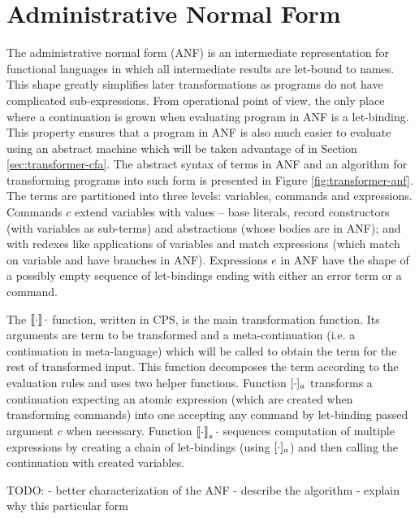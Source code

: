 \section{Administrative Normal Form}
The administrative normal form (ANF) \cite{flanagan-anf} is an intermediate representation for functional languages in which all intermediate results are let-bound to names.
This shape greatly simplifies later transformations as programs do not have complicated sub-expressions.
From operational point of view, the only place where a continuation is grown when evaluating program in ANF is a let-binding.
This property ensures that a program in ANF is also much easier to evaluate using an abstract machine which will be taken advantage of in Section \ref{sec:transformer-cfa}.
The abstract syntax of terms in ANF and an algorithm for transforming \IDL{} programs into such form is presented in Figure \ref{fig:transformer-anf}.
The terms are partitioned into three levels: variables, commands and expressions.
Commands $c$ extend variables with values -- base literals, record constructors (with variables as sub-terms) and abstractions (whose bodies are in ANF); and with redexes like applications of variables and match expressions (which match on variable and have branches in ANF).
Expressions $e$ in ANF have the shape of a possibly empty sequence of let-bindings ending with either an error term or a command.

The $\left\llbracket \cdot \right\rrbracket\cdot$ function, written in CPS, is the main transformation function.
Its arguments are term to be transformed and a meta-continuation (i.e. a continuation in meta-language) which will be called to obtain the term for the rest of transformed input.
This function decomposes the term according to the evaluation rules and uses two helper functions.
Function $[ \cdot ]_{a}$ transforms a continuation expecting an atomic expression (which are created when transforming commands) into one accepting any command by let-binding passed argument $c$ when necessary.
Function $\left\llbracket \cdot \right\rrbracket_{s} \cdot$ sequences computation of multiple expressions by creating a chain of let-bindings (using $[ \cdot ]_{a}$) and then calling the continuation with created variables.

TODO:
- better characterization of the ANF
- describe the algorithm
- explain why this particular form

